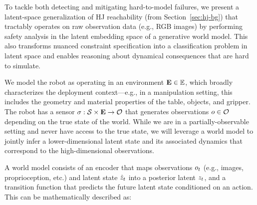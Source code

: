 To tackle both detecting and mitigating hard-to-model failures, we present a latent-space generalization of HJ reachability (from Section~\ref{sec:hj-bg}) that tractably operates on raw observation data (e.g., RGB images) by performing safety analysis in the latent embedding space of a generative world model.
This also transforms nuanced constraint specification into a classification problem in latent space and enables reasoning about dynamical consequences that are hard to simulate. 



 We model the robot as operating in an environment $\mathbf{E} \in \mathbb{E}$, which broadly characterizes the deployment context---e.g., in a manipulation setting, this includes the geometry and material properties of the table, objects, and gripper. The robot has a sensor $\sigma : \mathcal{S} \times \mathbf{E} \rightarrow \mathcal{O}$ that generates observations $o \in \mathcal{O}$
depending on the true state of the world.
While we are in a partially-observable setting and never have access to the true state, we will leverage a world model to jointly infer a lower-dimensional latent state and its associated dynamics that correspond to the high-dimensional observations.

A world model consists of an encoder that maps observations $o_t$ (e.g., images, proprioception, etc.) and  latent state $\hat{z}_t$ into a posterior latent $z_t$,
and a transition function that predicts the future latent state conditioned on an action. This can be mathematically described as:

